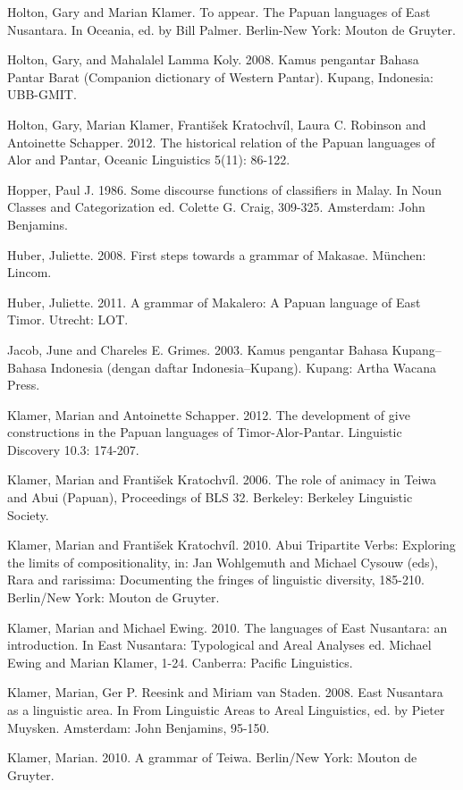 Holton, Gary and Marian Klamer. To appear. The Papuan languages of East Nusantara. In Oceania, ed. by Bill Palmer. Berlin-New York: Mouton de Gruyter. 

Holton, Gary, and Mahalalel Lamma Koly. 2008. Kamus pengantar Bahasa Pantar Barat (Companion dictionary of Western Pantar). Kupang, Indonesia: UBB-GMIT.

Holton, Gary, Marian Klamer, Franti\v{s}ek Kratochv\'il, Laura C. Robinson and Antoinette Schapper. 2012. The historical relation of the Papuan languages of Alor and Pantar, Oceanic Linguistics 5(11): 86-122. 

Hopper, Paul J. 1986. Some discourse functions of classifiers in Malay. In Noun Classes and Categorization ed. Colette G. Craig, 309-325. Amsterdam: John Benjamins. 

Huber, Juliette. 2008. First steps towards a grammar of Makasae. M\"unchen: Lincom.

Huber, Juliette. 2011. A grammar of Makalero: A Papuan language of East Timor. Utrecht: LOT.

Jacob, June and Chareles E. Grimes.  2003.  Kamus pengantar Bahasa Kupang--Bahasa Indonesia (dengan daftar Indonesia--Kupang). Kupang: Artha Wacana Press.  

Klamer, Marian and Antoinette Schapper. 2012. The development of give constructions in the Papuan languages of Timor-Alor-Pantar. Linguistic Discovery 10.3: 174-207. 

Klamer, Marian and Franti\v{s}ek Kratochv\'il. 2006. The role of animacy in Teiwa and Abui (Papuan), Proceedings of BLS 32. Berkeley: Berkeley Linguistic Society.

Klamer, Marian and Franti\v{s}ek Kratochv\'il. 2010. Abui Tripartite Verbs: Exploring the limits of compositionality, in: Jan Wohlgemuth and Michael Cysouw (eds), Rara and rarissima: Documenting the fringes of linguistic diversity, 185-210. Berlin/New York: Mouton de Gruyter. 

Klamer, Marian and Michael Ewing. 2010. The languages of East Nusantara: an introduction. In East Nusantara: Typological and Areal Analyses ed. Michael Ewing and Marian Klamer, 1-24. Canberra: Pacific Linguistics.

Klamer, Marian, Ger P. Reesink and Miriam van Staden. 2008. East Nusantara as a linguistic area. In From Linguistic Areas to Areal Linguistics, ed. by Pieter Muysken. Amsterdam: John Benjamins, 95-150. 

Klamer, Marian. 2010. A grammar of Teiwa. Berlin/New York: Mouton de Gruyter.

